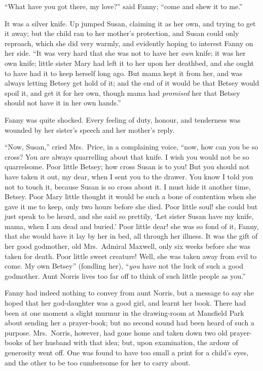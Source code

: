 ``What have you got there, my love?'' said Fanny;
``come and shew it to me.''

It was a silver knife.  Up jumped Susan, claiming it
as her own, and trying to get it away; but the child ran
to her mother's protection, and Susan could only reproach,
which she did very warmly, and evidently hoping to
interest Fanny on her side.  ``It was very hard that she
was not to have her \emph{own} knife; it was her own knife;
little sister Mary had left it to her upon her deathbed,
and she ought to have had it to keep herself long ago.
But mama kept it from her, and was always letting Betsey
get hold of it; and the end of it would be that Betsey
would spoil it, and get it for her own, though mama
had \emph{promised} her that Betsey should not have it in her
own hands.''

Fanny was quite shocked.  Every feeling of duty,
honour, and tenderness was wounded by her sister's
speech and her mother's reply.

``Now, Susan,'' cried Mrs.\ Price, in a complaining voice,
``now, how can you be so cross?  You are always quarrelling
about that knife.  I wish you would not be so quarrelsome.
Poor little Betsey; how cross Susan is to you!  But you
should not have taken it out, my dear, when I sent you
to the drawer.  You know I told you not to touch it,
because Susan is so cross about it.  I must hide it
another time, Betsey.  Poor Mary little thought it would
be such a bone of contention when she gave it me to keep,
only two hours before she died.  Poor little soul! she could
but just speak to be heard, and she said so prettily, `Let sister
Susan have my knife, mama, when I am dead and buried.'
Poor little dear! she was so fond of it, Fanny, that she
would have it lay by her in bed, all through her illness.
It was the gift of her good godmother, old Mrs.\ Admiral
Maxwell, only six weeks before she was taken for death.
Poor little sweet creature!  Well, she was taken away
from evil to come.  My own Betsey'' (fondling her),
``\emph{you} have not the luck of such a good godmother.
Aunt Norris lives too far off to think of such little
people as you.''

Fanny had indeed nothing to convey from aunt Norris,
but a message to say she hoped that her god-daughter
was a good girl, and learnt her book.  There had been
at one moment a slight murmur in the drawing-room
at Mansfield Park about sending her a prayer-book;
but no second sound had been heard of such a purpose.
Mrs.\ Norris, however, had gone home and taken down two
old prayer-books of her husband with that idea; but,
upon examination, the ardour of generosity went off.
One was found to have too small a print for a child's eyes,
and the other to be too cumbersome for her to carry about.

